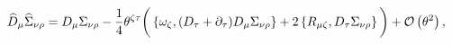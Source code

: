 \begin{equation}
\widehat D_\mu\widehat\Sigma_{\nu\rho}=D_\mu\Sigma_{\nu\rho}-\frac{1}{4}\theta^{\zeta\tau}
\bigg(\left\{\omega_\zeta,(D_\tau+\partial_\tau)D_\mu\Sigma_{\nu\rho}\right\}+2\left\{R_{\mu\zeta},
D_\tau\Sigma_{\nu\rho}\right\}\bigg)+{\cal O}\left( \theta ^{2}\right),
\end{equation}

